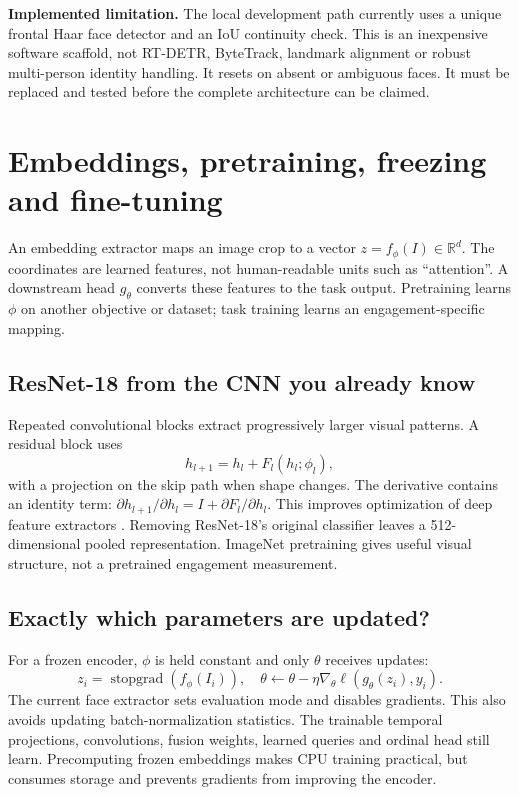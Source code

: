 \documentclass[10pt,a4paper]{article}
\newcommand{\R}{\mathbb{R}}
\begin{document}
\textbf{Implemented limitation.} The local development path currently uses a unique frontal Haar face detector and an IoU continuity check. This is an inexpensive software scaffold, not RT-DETR, ByteTrack, landmark alignment or robust multi-person identity handling. It resets on absent or ambiguous faces. It must be replaced and tested before the complete architecture can be claimed.

\section{Embeddings, pretraining, freezing and fine-tuning}
An embedding extractor maps an image crop to a vector $z=f_\phi(I)\in\R^d$. The coordinates are learned features, not human-readable units such as ``attention''. A downstream head $g_\theta$ converts these features to the task output. Pretraining learns $\phi$ on another objective or dataset; task training learns an engagement-specific mapping.

\subsection{ResNet-18 from the CNN you already know}
Repeated convolutional blocks extract progressively larger visual patterns. A residual block uses
\begin{equation}
h_{l+1}=h_l+F_l(h_l;\phi_l),
\end{equation}
with a projection on the skip path when shape changes. The derivative contains an identity term: $\partial h_{l+1}/\partial h_l=I+\partial F_l/\partial h_l$. This improves optimization of deep feature extractors \cite{resnet}. Removing ResNet-18's original classifier leaves a 512-dimensional pooled representation. ImageNet pretraining gives useful visual structure, not a pretrained engagement measurement.

\subsection{Exactly which parameters are updated?}
For a frozen encoder, $\phi$ is held constant and only $\theta$ receives updates:
\begin{equation}
z_i=\operatorname{stopgrad}(f_\phi(I_i)),\quad
\theta\leftarrow\theta-\eta\nabla_\theta\ell(g_\theta(z_i),y_i).
\end{equation}
The current face extractor sets evaluation mode and disables gradients. This also avoids updating batch-normalization statistics. The trainable temporal projections, convolutions, fusion weights, learned queries and ordinal head still learn. Precomputing frozen embeddings makes CPU training practical, but consumes storage and prevents gradients from improving the encoder.
\end{document}

